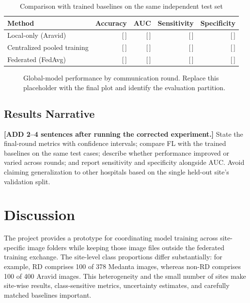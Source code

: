 \documentclass[conference]{IEEEtran}
\begin{document}
\begin{table}[htbp]
\caption{Comparison with trained baselines on the same independent test set}
\label{tab:baselines}
\centering
\begin{tabular}{lrrrr}
\toprule
\textbf{Method} & \textbf{Accuracy} & \textbf{AUC} & \textbf{Sensitivity} & \textbf{Specificity}\\
\midrule
Local-only (Aravid) & [\,] & [\,] & [\,] & [\,]\\
Centralized pooled training & [\,] & [\,] & [\,] & [\,]\\
Federated (FedAvg) & [\,] & [\,] & [\,] & [\,]\\
\bottomrule
\end{tabular}
\end{table}

\begin{figure}[htbp]
\centering
{}
\caption{Global-model performance by communication round. Replace this placeholder with the final plot and identify the evaluation partition.}
\label{fig:rounds}
\end{figure}

\subsection{Results Narrative}
\textbf{[ADD 2--4 sentences after running the corrected experiment.]} State the final-round metrics with confidence intervals; compare FL with the trained baselines on the same test cases; describe whether performance improved or varied across rounds; and report sensitivity and specificity alongside AUC. Avoid claiming generalization to other hospitals based on the single held-out site's validation split.

\section{Discussion}
The project provides a prototype for coordinating model training across site-specific image folders while keeping those image files outside the federated training exchange. The site-level class proportions differ substantially: for example, RD comprises 100 of 378 Medanta images, whereas non-RD comprises 100 of 400 Aravid images. This heterogeneity and the small number of sites make site-wise results, class-sensitive metrics, uncertainty estimates, and carefully matched baselines important.
\end{document}
